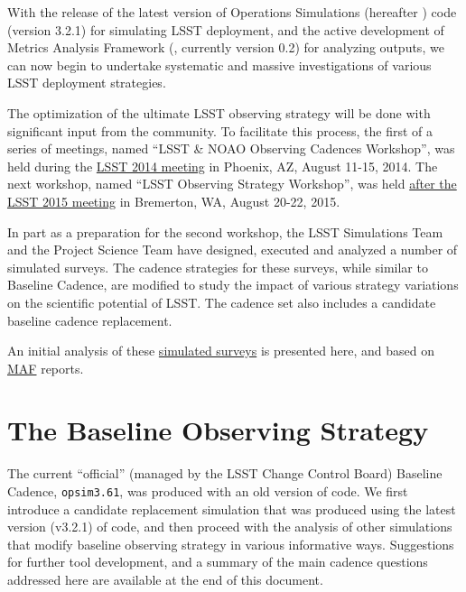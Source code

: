 With the release of the latest version of Operations Simulations
(hereafter \OpSim) code (version 3.2.1)  for simulating LSST
deployment, and the active development of Metrics Analysis Framework
(\MAF,  currently version 0.2) for analyzing \OpSim outputs, we can
now begin to undertake systematic and  massive investigations of
various LSST deployment strategies.

The optimization of the ultimate LSST observing strategy will be done
with significant input from  the community. To facilitate this
process, the first of a series of meetings, named ``LSST \& NOAO
Observing Cadences Workshop'', was held during the
\href{https://project.lsst.org/meetings/ocw}{LSST 2014 meeting} in
Phoenix, AZ, August 11-15, 2014. The next workshop, named ``LSST
Observing Strategy Workshop'',  was held
\href{http://lsstsciencecollaborations.github.io/ObservingStrategy/}{after
the LSST 2015 meeting} in Bremerton, WA, August 20-22, 2015.

In part as a preparation for the second workshop, the LSST
Simulations Team and the Project Science Team have designed, executed
and analyzed a number of simulated surveys.  The cadence strategies
for these surveys, while similar to Baseline Cadence, are modified to
study the impact of various strategy variations on the scientific
potential of LSST. The cadence set also includes a candidate baseline
cadence replacement.

An initial analysis of these 
\href{http://ops2.lsst.org:8080}{simulated surveys} is presented here,
and based on \href{https://confluence.lsstcorp.org/display/SIM/MAF+documentation}{MAF}
reports.


\listofopsimdbs

\navigationbar


\section{The Baseline Observing Strategy}
\def\secname{cadexp:baseline}\label{sec:\secname}

The current ``official'' (managed by the LSST Change Control Board)
Baseline Cadence, \texttt{opsim3.61},  was produced with an old version of
\OpSim code. We first introduce a candidate replacement simulation
that was produced using  the latest version (v3.2.1) of \OpSim code,
and then proceed with the analysis of other simulations that modify baseline
observing strategy in various informative ways. Suggestions for
further tool development, and a summary of the main cadence questions
addressed here are available at the end of this document.

